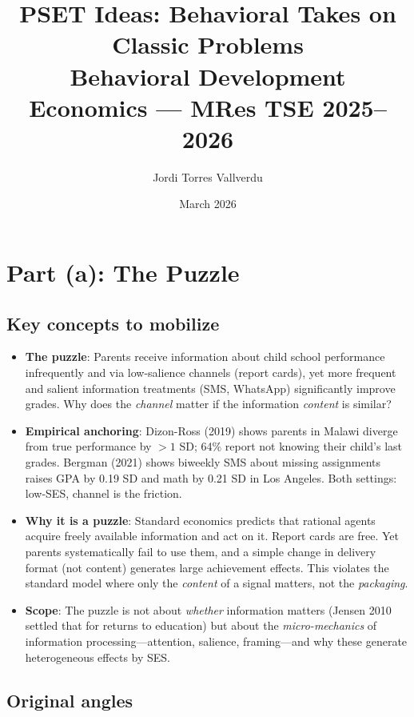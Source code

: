 \documentclass[11pt]{article}
\title{PSET Ideas: Behavioral Takes on Classic Problems\\[4pt]
\large Behavioral Development Economics --- MRes TSE 2025--2026}
\author{Jordi Torres Vallverdu}
\date{March 2026}
\begin{document}
\maketitle
\tableofcontents
\newpage

\section{Part (a): The Puzzle}

\subsection{Key concepts to mobilize}

\begin{itemize}
  \item \textbf{The puzzle}: Parents receive information about child school performance infrequently and via low-salience channels (report cards), yet more frequent and salient information treatments (SMS, WhatsApp) significantly improve grades. Why does the \emph{channel} matter if the information \emph{content} is similar?
  \item \textbf{Empirical anchoring}: Dizon-Ross (2019) shows parents in Malawi diverge from true performance by $>1$ SD; 64\% report not knowing their child's last grades. Bergman (2021) shows biweekly SMS about missing assignments raises GPA by 0.19 SD and math by 0.21 SD in Los Angeles. Both settings: low-SES, channel is the friction.
  \item \textbf{Why it is a puzzle}: Standard economics predicts that rational agents acquire freely available information and act on it. Report cards are free. Yet parents systematically fail to use them, and a simple change in delivery format (not content) generates large achievement effects. This violates the standard model where only the \emph{content} of a signal matters, not the \emph{packaging}.
  \item \textbf{Scope}: The puzzle is not about \emph{whether} information matters (Jensen 2010 settled that for returns to education) but about the \emph{micro-mechanics} of information processing---attention, salience, framing---and why these generate heterogeneous effects by SES.
\end{itemize}

\subsection{Original angles}
\end{document}
